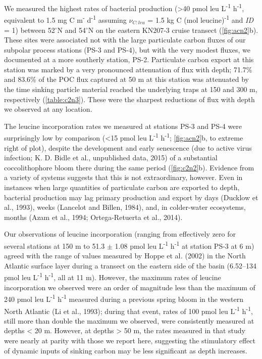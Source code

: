 We measured the highest rates of bacterial production (\textgreater{}40 pmol leu L\textsuperscript{-1} h\textsuperscript{-1}, equivalent to 1.5 mg C m\textsuperscript{-} d\textsuperscript{-1} assuming $\nu _{C:leu}$ = 1.5 kg C (mol leucine)\textsuperscript{-1} and \emph{ID} = 1) between 52$^{\circ}$N and 54$^{\circ}$N on the eastern KN207-3 cruise transect (\autoref{fig:acn2}b). These sites were associated not with the large particulate carbon fluxes of our subpolar process stations (PS-3 and PS-4), but with the very modest fluxes, we documented at a more southerly station, PS-2. Particulate carbon export at this station was marked by a very pronounced attenuation of flux with depth; 71.7\% and 83.6\% of the POC flux captured at 50 m at this station was attenuated by the time sinking particle material reached the underlying traps at 150 and 300 m, respectively (\autoref{table:c2n3}). These were the sharpest reductions of flux with depth we observed at any location.

The leucine incorporation rates we measured at stations PS-3 and PS-4 were surprisingly low by comparison (\textless{}15 pmol leu L\textsuperscript{-1} h\textsuperscript{-1}; \autoref{fig:acn2}b, to extreme right of plot), despite the development and early senescence (due to active virus infection; K. D. Bidle et al., unpublished data, 2015) of a substantial coccolithophore bloom there during the same period (\autoref{fig:c2n2}b). Evidence from a variety of systems suggests that this is not extraordinary, however. Even in instances when large quantities of particulate carbon are exported to depth, bacterial production may lag primary production and export by days (Ducklow et al., 1993), weeks (Lancelot and Billen, 1984), and, in colder-water ecosystems, months (Azam et al., 1994; Ortega-Retuerta et al., 2014).

Our observations of leucine incorporation (ranging from effectively zero for several stations at 150 m to 51.3 $\pm$ 1.08 pmol leu L\textsuperscript{-1} h\textsuperscript{-1} at station PS-3 at 6 m) agreed with the range of values measured by Hoppe et al\emph{.} (2002) in the North Atlantic surface layer during a transect on the eastern side of the basin (6.52--134 pmol leu L\textsuperscript{-1} h\textsuperscript{-1}, all at 11 m). However, the maximum rates of leucine incorporation we observed were an order of magnitude less than the maximum of 240 pmol leu L\textsuperscript{-1} h\textsuperscript{-1} measured during a previous spring bloom in the western North Atlantic (Li et al., 1993); during that event, rates of 100 pmol leu L\textsuperscript{-1} h\textsuperscript{-1}, still more than double the maximum we observed, were consistently measured at depths \textless{} 20 m. However, at depths \textgreater{} 50 m, the rates measured in that study were nearly at parity with those we report here, suggesting the stimulatory effect of dynamic inputs of sinking carbon may be less significant as depth increases.

